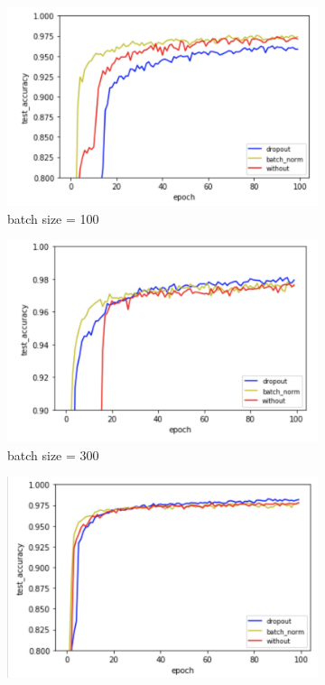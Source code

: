 \documentclass[12pt,letterpaper]{article}
\begin{document}
\begin{figure}[h]
    \begin{subfigure}{0.32\textwidth}
    \includegraphics[width=\linewidth]{MLP_2hiddenLayer.png}
    \caption{\small batch size = 100} \label{fig:a}
    \end{subfigure}\hspace*{\fill}
    \begin{subfigure}{0.32\textwidth}
    \includegraphics[width=\linewidth]{MAP_2hidden_300batchsize.png}
    \caption{\small batch size = 300} \label{fig:b}
    \end{subfigure}
    \begin{subfigure}{0.32\textwidth}
    \includegraphics[width=\linewidth]{MAP_2hidden_500batchsize.png}

\end{subfigure}
\end{figure}
\end{document}
